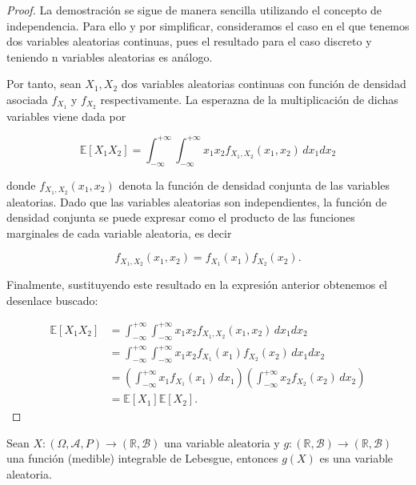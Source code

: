 \begin{proof}
    La demostración se sigue de manera sencilla utilizando el concepto de independencia. Para ello y por simplificar, consideramos el caso en el que tenemos dos variables aleatorias continuas, pues el resultado para el caso discreto y teniendo n variables aleatorias es análogo.\newline

    Por tanto, sean $X_1, X_2$ dos variables aleatorias continuas con función de densidad asociada $f_{X_1}$ y $f_{X_2}$ respectivamente. La esperazna de la multiplicación de dichas variables viene dada por

    \[ \mathbb{E}[X_1X_2] = \int_{-\infty}^{+\infty}\int_{-\infty}^{+\infty} x_1x_2 f_{X_1, X_2} (x_1, x_2) \, dx_1dx_2 \]

    donde $f_{X_1, X_2} (x_1, x_2)$ denota la función de densidad conjunta de las variables aleatorias. Dado que las variables aleatorias son independientes, la función de densidad conjunta se puede expresar como el producto de las funciones marginales de cada variable aleatoria, es decir

    \[ f_{X_1, X_2} (x_1, x_2) = f_{X_1}(x_1) f_{X_2}(x_2). \]\newline

    Finalmente, sustituyendo este resultado en la expresión anterior obtenemos el desenlace buscado:

    \begin{align*}
        \mathbb{E}[X_1 X_2] &= \int_{-\infty}^{+\infty} \int_{-\infty}^{+\infty} x_1 x_2 f_{X_1, X_2}(x_1, x_2) \, dx_1 dx_2 \\
        &= \int_{-\infty}^{+\infty} \int_{-\infty}^{+\infty} x_1 x_2 f_{X_1}(x_1) f_{X_2}(x_2) \, dx_1 dx_2 \\
        &= \left(\int_{-\infty}^{+\infty} x_1 f_{X_1}(x_1) \, dx_1\right)
           \left(\int_{-\infty}^{+\infty} x_2 f_{X_2}(x_2) \, dx_2\right) \\
        &= \mathbb{E}[X_1] \mathbb{E}[X_2].
    \end{align*}
    \newline
\end{proof}

\begin{proposicion}
    Sean $X: (\Omega, \mathcal{A}, P) \to (\mathbb{R}, \mathcal{B})$ una variable aleatoria y $g:(\mathbb{R},\mathcal{B}) \to (\mathbb{R},\mathcal{B})$ una función (medible) integrable de Lebesgue, entonces $g(X)$ es una variable aleatoria.\newline
\end{proposicion}

